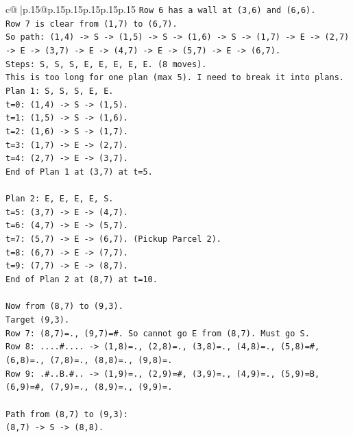 \documentclass{article}
\begin{document}
{\begin{supertabular}{c@{$\;$}|p{.15\linewidth}@{}p{.15\linewidth}p{.15\linewidth}p{.15\linewidth}p{.15\linewidth}p{.15\linewidth}}
{{{\texttt{Row 6 has a wall at (3,6) and (6,6).} \\
\texttt{Row 7 is clear from (1,7) to (6,7).} \\
\texttt{So path: (1,4) {-}> S {-}> (1,5) {-}> S {-}> (1,6) {-}> S {-}> (1,7) {-}> E {-}> (2,7) {-}> E {-}> (3,7) {-}> E {-}> (4,7) {-}> E {-}> (5,7) {-}> E {-}> (6,7).} \\
\texttt{Steps: S, S, S, E, E, E, E, E. (8 moves).} \\
\texttt{This is too long for one plan (max 5). I need to break it into plans.} \\
\texttt{Plan 1: S, S, S, E, E.} \\
\texttt{t=0: (1,4) {-}> S {-}> (1,5).} \\
\texttt{t=1: (1,5) {-}> S {-}> (1,6).} \\
\texttt{t=2: (1,6) {-}> S {-}> (1,7).} \\
\texttt{t=3: (1,7) {-}> E {-}> (2,7).} \\
\texttt{t=4: (2,7) {-}> E {-}> (3,7).} \\
\texttt{End of Plan 1 at (3,7) at t=5.} \\
\\ 
\texttt{Plan 2: E, E, E, E, S.} \\
\texttt{t=5: (3,7) {-}> E {-}> (4,7).} \\
\texttt{t=6: (4,7) {-}> E {-}> (5,7).} \\
\texttt{t=7: (5,7) {-}> E {-}> (6,7). (Pickup Parcel 2).} \\
\texttt{t=8: (6,7) {-}> E {-}> (7,7).} \\
\texttt{t=9: (7,7) {-}> E {-}> (8,7).} \\
\texttt{End of Plan 2 at (8,7) at t=10.} \\
\\ 
\texttt{Now from (8,7) to (9,3).} \\
\texttt{Target (9,3).} \\
\texttt{Row 7: (8,7)=., (9,7)=\#. So cannot go E from (8,7). Must go S.} \\
\texttt{Row 8: ....\#.... {-}> (1,8)=., (2,8)=., (3,8)=., (4,8)=., (5,8)=\#, (6,8)=., (7,8)=., (8,8)=., (9,8)=.} \\
\texttt{Row 9: .\#..B.\#.. {-}> (1,9)=., (2,9)=\#, (3,9)=., (4,9)=., (5,9)=B, (6,9)=\#, (7,9)=., (8,9)=., (9,9)=.} \\
\\ 
\texttt{Path from (8,7) to (9,3):} \\
\texttt{(8,7) {-}> S {-}> (8,8).} \\
}}}
\end{supertabular}}
\end{document}
